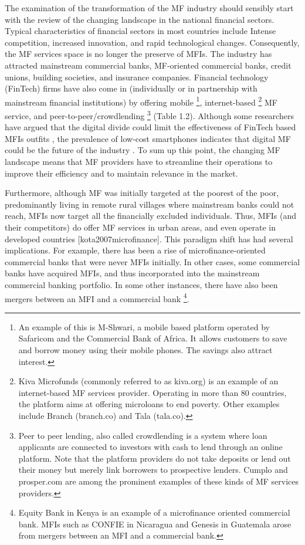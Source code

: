 \documentclass[a4paper,nobind]{templates/ociamthesis}
\begin{document}
The examination of the transformation of the MF industry should sensibly start with the review of the changing landscape in the national financial sectors. Typical characteristics of financial sectors in most countries include Intense competition, increased innovation, and rapid technological changes. Consequently, the MF services space is no longer the preserve of MFIs. The industry has attracted mainstream commercial banks, MF-oriented commercial banks, credit unions, building societies, and insurance companies. Financial technology (FinTech) firms have also come in (individually or in partnership with mainstream financial institutions) by offering mobile \footnote{An example of this is M-Shwari, a mobile based platform operated by Safaricom and the Commercial Bank of Africa. It allows customers to save and borrow money using their mobile phones. The savings also attract interest.}, internet-based \footnote{Kiva Microfunds (commonly referred to as kiva.org) is an example of an internet-based MF services provider. Operating in more than 80 countries, the platform aims at offering microloans to end poverty. Other examples include Branch (branch.co) and Tala (tala.co).} MF service, and peer-to-peer/crowdlending \footnote{Peer to peer lending, also called crowdlending is a system where loan applicants are connected to investors with cash to lend through an online platform. Note that the platform providers do not take deposits or lend out their money but merely link borrowers to prospective lenders. Cumplo and prosper.com are among the prominent examples of these kinds of MF services providers.} (Table 1.2). Although some researchers have argued that the digital divide could limit the effectiveness of FinTech based MFIs outfits \autocite{yartey2017subaltern,fd2017}, the prevalence of low-cost smartphones indicates that digital MF could be the future of the industry \autocite{yum2012wisdom}. To sum up this point, the changing MF landscape means that MF providers have to streamline their operations to improve their efficiency and to maintain relevance in the market.

Furthermore, although MF was initially targeted at the poorest of the poor, predominantly living in remote rural villages where mainstream banks could not reach, MFIs now target all the financially excluded individuals. Thus, MFIs (and their competitors) do offer MF services in urban areas, and even operate in developed countries {[}kota2007microfinance{]}. This paradigm shift has had several implications. For example, there has been a rise of microfinance-oriented commercial banks that were never MFIs initially. In other cases, some commercial banks have acquired MFIs, and thus incorporated into the mainstream commercial banking portfolio. In some other instances, there have also been mergers between an MFI and a commercial bank \footnote{Equity Bank in Kenya is an example of a microfinance oriented commercial bank. MFIs such as CONFIE in Nicaragua and Genesis in Guatemala arose from mergers between an MFI and a commercial bank.}.
\end{document}
